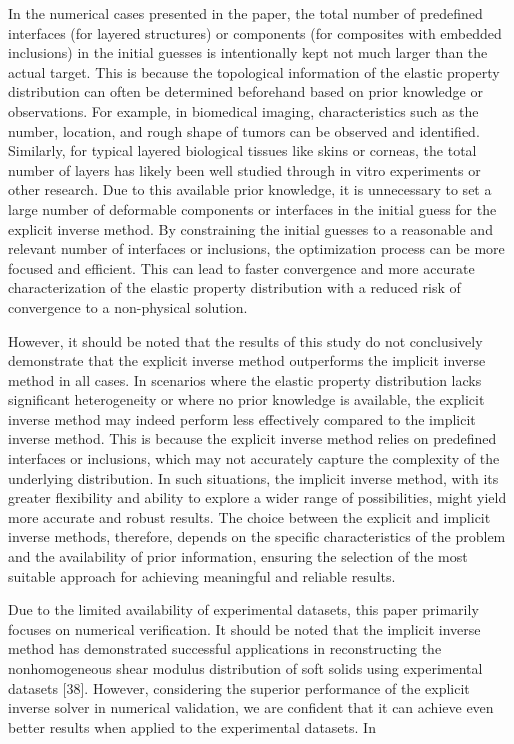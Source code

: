 \documentclass[11pt]{article}
\begin{document}
\vspace{1em}

\noindent
In the numerical cases presented in the paper, the total number
of predefined interfaces (for layered structures) or components
(for composites with embedded inclusions) in the initial guesses
is intentionally kept not much larger than the actual target.
This is because the topological information of the elastic
property distribution can often be determined beforehand based
on prior knowledge or observations. For example, in biomedical
imaging, characteristics such as the number, location, and rough
shape of tumors can be observed and identified. Similarly, for
typical layered biological tissues like skins or corneas, the
total number of layers has likely been well studied through in
vitro experiments or other research. Due to this available prior
knowledge, it is unnecessary to set a large number of
deformable components or interfaces in the initial guess for
the explicit inverse method. By constraining the initial guesses
to a reasonable and relevant number of interfaces or inclusions,
the optimization process can be more focused and efficient.
This can lead to faster convergence and more accurate
characterization of the elastic property distribution with a
reduced risk of convergence to a non-physical solution.

However, it should be noted that the results of this study do
not conclusively demonstrate that the explicit inverse method
outperforms the implicit inverse method in all cases. In
scenarios where the elastic property distribution lacks
significant heterogeneity or where no prior knowledge is
available, the explicit inverse method may indeed perform less
effectively compared to the implicit inverse method. This is
because the explicit inverse method relies on predefined
interfaces or inclusions, which may not accurately capture the
complexity of the underlying distribution. In such situations,
the implicit inverse method, with its greater flexibility and
ability to explore a wider range of possibilities, might yield
more accurate and robust results. The choice between the
explicit and implicit inverse methods, therefore, depends on
the specific characteristics of the problem and the availability
of prior information, ensuring the selection of the most
suitable approach for achieving meaningful and reliable results.

Due to the limited availability of experimental datasets, this
paper primarily focuses on numerical verification. It should be
noted that the implicit inverse method has demonstrated
successful applications in reconstructing the nonhomogeneous
shear modulus distribution of soft solids using experimental
datasets [38]. However, considering the superior performance of
the explicit inverse solver in numerical validation, we are
confident that it can achieve even better results when applied
to the experimental datasets. In

\end{document}
